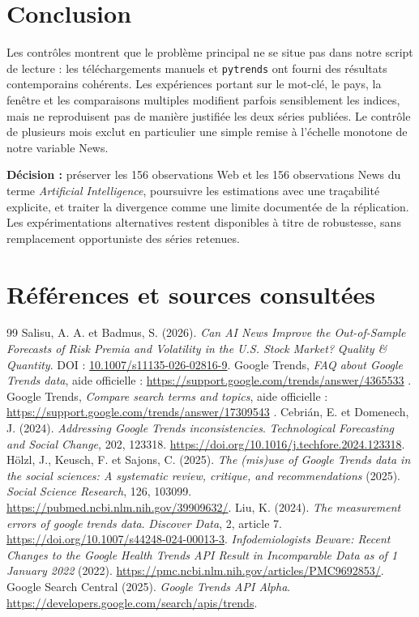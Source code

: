 \documentclass[11pt,a4paper]{article}
\begin{document}
\section{Conclusion}
Les contrôles montrent que le problème principal ne se situe pas dans notre script de lecture : les téléchargements manuels et \texttt{pytrends} ont fourni des résultats contemporains cohérents. Les expériences portant sur le mot-clé, le pays, la fenêtre et les comparaisons multiples modifient parfois sensiblement les indices, mais ne reproduisent pas de manière justifiée les deux séries publiées. Le contrôle de plusieurs mois exclut en particulier une simple remise à l'échelle monotone de notre variable News.

\textbf{Décision :} préserver les 156 observations Web et les 156 observations News du terme \emph{Artificial Intelligence}, poursuivre les estimations avec une traçabilité explicite, et traiter la divergence comme une limite documentée de la réplication. Les expérimentations alternatives restent disponibles à titre de robustesse, sans remplacement opportuniste des séries retenues.

\clearpage
\section*{Références et sources consultées}
\begin{thebibliography}{99}\small
{} Salisu, A. A. et Badmus, S. (2026). \emph{Can AI News Improve the Out-of-Sample Forecasts of Risk Premia and Volatility in the U.S. Stock Market?} \emph{Quality \& Quantity}. DOI : \href{https://doi.org/10.1007/s11135-026-02816-9}{10.1007/s11135-026-02816-9}.
 Google Trends, \emph{FAQ about Google Trends data}, aide officielle : \url{https://support.google.com/trends/answer/4365533} .
 Google Trends, \emph{Compare search terms and topics}, aide officielle : \url{https://support.google.com/trends/answer/17309543} .
 Cebrián, E. et Domenech, J. (2024). \emph{Addressing Google Trends inconsistencies}. \emph{Technological Forecasting and Social Change}, 202, 123318. \url{https://doi.org/10.1016/j.techfore.2024.123318}.
 Hölzl, J., Keusch, F. et Sajons, C. (2025). \emph{The (mis)use of Google Trends data in the social sciences: A systematic review, critique, and recommendations} (2025). \emph{Social Science Research}, 126, 103099. \url{https://pubmed.ncbi.nlm.nih.gov/39909632/}.
 Liu, K. (2024). \emph{The measurement errors of google trends data}. \emph{Discover Data}, 2, article 7. \url{https://doi.org/10.1007/s44248-024-00013-3}.
 \emph{Infodemiologists Beware: Recent Changes to the Google Health Trends API Result in Incomparable Data as of 1 January 2022} (2022). \url{https://pmc.ncbi.nlm.nih.gov/articles/PMC9692853/}.
 Google Search Central (2025). \emph{Google Trends API Alpha}. \url{https://developers.google.com/search/apis/trends}.
\end{thebibliography}
\end{document}
